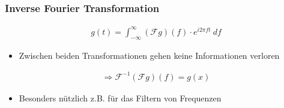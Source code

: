 \begin{frame}
    \frametitle{Inverse Fourier Transformation}
    \begin{align*}
        g(t)=\int_{-\infty}^{\infty}{(\mathcal F g)(f)\cdot  e^{i2\pi f t}\ df}
    \end{align*} 
    \begin{itemize}
        \item Zwischen beiden Transformationen gehen keine Informationen verloren
    \end{itemize}
    \begin{align*}
        \Rightarrow \mathcal{F}^{-1}(\mathcal F g)(f)=g(x)
    \end{align*}
    \vspace*{-15px}
    \begin{itemize}
        \item Besonders nützlich z.B. für das Filtern von Frequenzen
    \end{itemize}
\end{frame}
